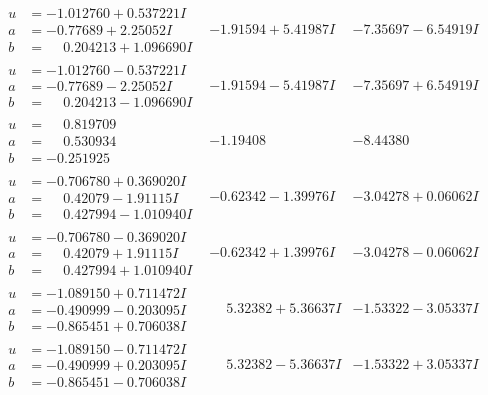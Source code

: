 \documentclass[1p]{elsarticle_modified}
\theoremstyle{definition}
\begin{document}
$$\begin{array}{c|c|c}
\begin{aligned}
u &= -1.012760 + 0.537221 I \\
a &= -0.77689 + 2.25052 I \\
b &= \phantom{-}0.204213 + 1.096690 I\end{aligned}
 & -1.91594 + 5.41987 I & -7.35697 - 6.54919 I \\ \hline\begin{aligned}
u &= -1.012760 - 0.537221 I \\
a &= -0.77689 - 2.25052 I \\
b &= \phantom{-}0.204213 - 1.096690 I\end{aligned}
 & -1.91594 - 5.41987 I & -7.35697 + 6.54919 I \\ \hline\begin{aligned}
u &= \phantom{-}0.819709\phantom{ +0.000000I} \\
a &= \phantom{-}0.530934\phantom{ +0.000000I} \\
b &= -0.251925\phantom{ +0.000000I}\end{aligned}
 & -1.19408\phantom{ +0.000000I} & -8.44380\phantom{ +0.000000I} \\ \hline\begin{aligned}
u &= -0.706780 + 0.369020 I \\
a &= \phantom{-}0.42079 - 1.91115 I \\
b &= \phantom{-}0.427994 - 1.010940 I\end{aligned}
 & -0.62342 - 1.39976 I & -3.04278 + 0.06062 I \\ \hline\begin{aligned}
u &= -0.706780 - 0.369020 I \\
a &= \phantom{-}0.42079 + 1.91115 I \\
b &= \phantom{-}0.427994 + 1.010940 I\end{aligned}
 & -0.62342 + 1.39976 I & -3.04278 - 0.06062 I \\ \hline\begin{aligned}
u &= -1.089150 + 0.711472 I \\
a &= -0.490999 - 0.203095 I \\
b &= -0.865451 + 0.706038 I\end{aligned}
 & \phantom{-}5.32382 + 5.36637 I & -1.53322 - 3.05337 I \\ \hline\begin{aligned}
u &= -1.089150 - 0.711472 I \\
a &= -0.490999 + 0.203095 I \\
b &= -0.865451 - 0.706038 I\end{aligned}
 & \phantom{-}5.32382 - 5.36637 I & -1.53322 + 3.05337 I \\ \hline\begin{aligned}

\end{aligned}
\end{array}$$
\end{document}
